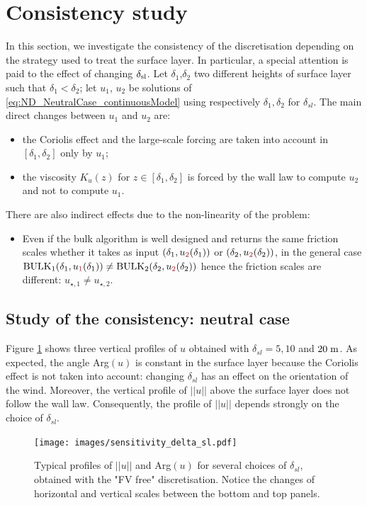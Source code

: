 \section{Consistency study}
\label{sec:ND_Consistency}
In this section, we investigate the consistency of the
discretisation depending on the strategy used to treat the
surface layer. In particular, a special attention is paid to
the effect of changing $\delta_{\rm sl}$.
Let $\delta_1$,$\delta_2$ two
different heights of surface layer
such that $\delta_1 < \delta_2$;
let $u_1$, $u_2$ be solutions of 
\eqref{eq:ND_NeutralCase_continuousModel} using
respectively $\delta_1, \delta_2$ for $\delta_{sl}$.
The main direct changes between $u_1$ and $u_2$ are:
\begin{itemize}
\item the Coriolis effect and the large-scale forcing are
taken into account in $[\delta_{1}, \delta_{2}]$
		only by $u_1$;
\item the viscosity $K_u(z)$ for $z \in [\delta_{1}, \delta_{2}]$
	is forced by the wall law to compute $u_2$
		and not to compute $u_1$.
\end{itemize}
There are also indirect effects due to the non-linearity of the
problem:
\begin{itemize}
	\item Even if the bulk algorithm is well designed and returns
		the same friction scales whether it takes as input
		$(\delta_1, u_\emphase{2}(\delta_1))$ or
		$(\delta_2, u_\emphase{2}(\delta_2))$,
		in the general case
		${\rm BULK}_1(\delta_1, u_\emphase{1}(\delta_1)) \neq
		{\rm BULK}_2(\delta_2, u_\emphase{2}(\delta_2))$
		hence the friction scales
		are different: $u_{\star, 1} \neq u_{\star, 2}$.
\end{itemize}

\subsection{Study of the consistency: neutral case}
Figure \ref{fig:ND_Consistency_sensitivity_delta_sl} shows
three vertical profiles of $u$ obtained with
$\delta_{sl} = 5, 10$ and $20 \; {\rm m}$.
As expected, the angle Arg$(u)$
is constant in the surface layer because
the Coriolis effect is not taken into
account: changing $\delta_{sl}$
has an effect on the orientation of the wind.
Moreover, the vertical profile of $||u||$ above the
surface layer does not follow the wall law.
Consequently, the profile of $||u||$ depends strongly
on the choice of $\delta_{sl}$.
%
\begin{figure}
	\centering
\texttt{[image: images/sensitivity\_delta\_sl.pdf]}
	\caption{Typical profiles of $||u||$ and Arg$(u)$ for several
	choices of $\delta_{sl}$, obtained with the "FV free"
	discretisation. Notice the changes of horizontal
	and vertical scales between the bottom and top panels.}
	\label{fig:ND_Consistency_sensitivity_delta_sl}
\end{figure}
